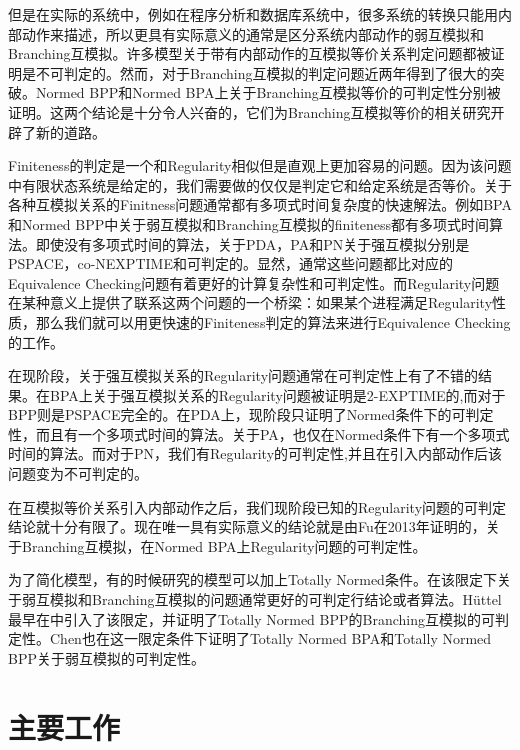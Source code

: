 但是在实际的系统中，例如在程序分析和数据库系统中，很多系统的转换只能用内部动作来描述，所以更具有实际意义的通常是区分系统内部动作的弱互模拟和Branching互模拟。许多模型关于带有内部动作的互模拟等价关系判定问题都被证明是不可判定的\cite{Jancar2008}。然而，对于Branching互模拟的判定问题近两年得到了很大的突破。Normed BPP和Normed BPA上关于Branching互模拟等价的可判定性分别被证明\cite{CzerwiAski2011,Fu2013}。这两个结论是十分令人兴奋的，它们为Branching互模拟等价的相关研究开辟了新的道路。

Finiteness的判定是一个和Regularity相似但是直观上更加容易的问题。因为该问题中有限状态系统是给定的，我们需要做的仅仅是判定它和给定系统是否等价。关于各种互模拟关系的Finitness问题通常都有多项式时间复杂度的快速解法。例如BPA和Normed BPP中关于弱互模拟和Branching互模拟的finiteness都有多项式时间算法\cite{Kucera2002,Fu2009}。即使没有多项式时间的算法，关于PDA，PA和PN关于强互模拟分别是PSPACE\cite{Kucera2002a}，co-NEXPTIME\cite{Goller2011}和可判定的\cite{Jancar1995a}。显然，通常这些问题都比对应的Equivalence Checking问题有着更好的计算复杂性和可判定性。而Regularity问题在某种意义上提供了联系这两个问题的一个桥梁：如果某个进程满足Regularity性质，那么我们就可以用更快速的Finiteness判定的算法来进行Equivalence Checking的工作。

在现阶段，关于强互模拟关系的Regularity问题通常在可判定性上有了不错的结果。在BPA上关于强互模拟关系的Regularity问题被证明是2-EXPTIME的\cite{Burkart1995,Burkart1996},而对于BPP则是PSPACE完全的\cite{Kot2005a}。在PDA上，现阶段只证明了Normed条件下的可判定性，而且有一个多项式时间的算法\cite{Esparza2000}。关于PA，也仅在Normed条件下有一个多项式时间的算法\cite{Kucera1996}。而对于PN，我们有Regularity的可判定性,并且在引入内部动作后该问题变为不可判定的\cite{Jancar1995a}。

在互模拟等价关系引入内部动作之后，我们现阶段已知的Regularity问题的可判定结论就十分有限了。现在唯一具有实际意义的结论就是由Fu在2013年证明的，关于Branching互模拟，在Normed BPA上Regularity问题的可判定性\cite{Fu2013}。

为了简化模型，有的时候研究的模型可以加上Totally Normed条件。在该限定下关于弱互模拟和Branching互模拟的问题通常更好的可判定行结论或者算法。H\"{u}ttel最早在\cite{Huttel1992}中引入了该限定，并证明了Totally Normed BPP的Branching互模拟的可判定性。Chen也在这一限定条件下证明了Totally Normed BPA和Totally Normed BPP关于弱互模拟的可判定性\cite{Chen2008a,Chen2008}。

\section{主要工作}
\label{sec:contribution}

